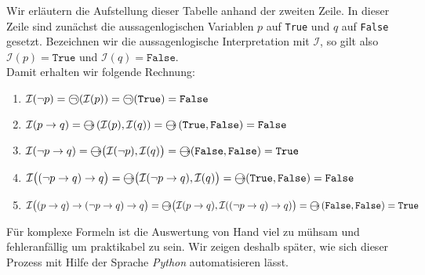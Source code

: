 Wir erläutern die Aufstellung dieser Tabelle anhand der zweiten Zeile.  In dieser Zeile sind zunächst die
aussagenlogischen Variablen $p$ auf \texttt{True} und $q$ auf \texttt{False} gesetzt.  Bezeichnen wir die
aussagenlogische Interpretation mit $\mathcal{I}$, so gilt also\\[0.2cm]
\hspace*{1.3cm} $\mathcal{I}(p) = \texttt{True}$ und $\mathcal{I}(q) = \texttt{False}$. \\[0.2cm]
Damit erhalten wir folgende Rechnung:
\begin{enumerate}
\item $\mathcal{I}(\neg p) = \circneg\,(\mathcal{I}(p)) = \circneg\,( \texttt{True}) = \texttt{False}$
\item $\mathcal{I}(p \rightarrow q) = \circright\,(\mathcal{I}(p), \mathcal{I}(q)) = \circright\,(\texttt{True}, \texttt{False}) = \texttt{False}$
\item $\mathcal{I}(\neg p \rightarrow q) = \circright\bigl( \mathcal{I}(\neg p), \mathcal{I}(q)\bigr) = \circright(\texttt{False}, \texttt{False}) = \texttt{True}$
\item $\mathcal{I}\bigl((\neg p \rightarrow q) \rightarrow q\bigr) = 
          \circright\bigl( \mathcal{I}(\neg p \rightarrow q), \mathcal{I}(q) \bigr) = 
          \circright( \texttt{True}, \texttt{False} ) = \texttt{False}$
\item $\mathcal{I}\bigl((p \rightarrow q) \rightarrow  (\neg p \rightarrow q) \rightarrow q\bigr) = 
      \circright\bigl( \mathcal{I}(p \rightarrow q),  \mathcal{I}((\neg p \rightarrow q) \rightarrow q)\bigr) = 
       \circright\,( \texttt{False},  \texttt{False} ) = \texttt{True}$
\end{enumerate}
Für komplexe Formeln ist die Auswertung von Hand viel zu mühsam und
fehleranfällig um praktikabel zu sein.  Wir zeigen deshalb später, wie
sich dieser Prozess mit Hilfe der Sprache \textsl{Python} automatisieren lässt.

